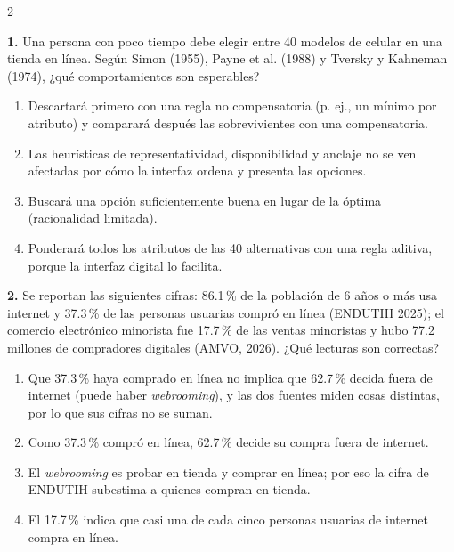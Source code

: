 \documentclass[10pt,letterpaper]{article}
\newcommand{\cas}{\framebox[1.0em]{\rule{0pt}{1.05ex}}}
\begin{document}
\begin{multicols}{2}
\begin{minipage}[t]{\columnwidth}\noindent\textbf{1.} Una persona con poco tiempo debe elegir entre 40 modelos de celular en una tienda en línea. Según Simon (1955), Payne et al. (1988) y Tversky y Kahneman (1974), ¿qué comportamientos son esperables?
\vspace{1pt}\begin{enumerate}[label=\cas\ \alph*),leftmargin=2.3em,itemsep=1.2pt,topsep=1pt,parsep=0pt,partopsep=0pt]
\item Descartará primero con una regla no compensatoria (p. ej., un mínimo por atributo) y comparará después las sobrevivientes con una compensatoria.
\item Las heurísticas de representatividad, disponibilidad y anclaje no se ven afectadas por cómo la interfaz ordena y presenta las opciones.
\item Buscará una opción suficientemente buena en lugar de la óptima (racionalidad limitada).
\item Ponderará todos los atributos de las 40 alternativas con una regla aditiva, porque la interfaz digital lo facilita.
\end{enumerate}\end{minipage}\par\vspace{3pt}
\begin{minipage}[t]{\columnwidth}\noindent\textbf{2.} Se reportan las siguientes cifras: 86.1\,\% de la población de 6 años o más usa internet y 37.3\,\% de las personas usuarias compró en línea (ENDUTIH 2025); el comercio electrónico minorista fue 17.7\,\% de las ventas minoristas y hubo 77.2 millones de compradores digitales (AMVO, 2026). ¿Qué lecturas son correctas?
\vspace{1pt}\begin{enumerate}[label=\cas\ \alph*),leftmargin=2.3em,itemsep=1.2pt,topsep=1pt,parsep=0pt,partopsep=0pt]
\item Que 37.3\,\% haya comprado en línea no implica que 62.7\,\% decida fuera de internet (puede haber \textit{webrooming}), y las dos fuentes miden cosas distintas, por lo que sus cifras no se suman.
\item Como 37.3\,\% compró en línea, 62.7\,\% decide su compra fuera de internet.
\item El \textit{webrooming} es probar en tienda y comprar en línea; por eso la cifra de ENDUTIH subestima a quienes compran en tienda.
\item El 17.7\,\% indica que casi una de cada cinco personas usuarias de internet compra en línea.

\end{enumerate}
\end{minipage}
\end{multicols}
\end{document}
